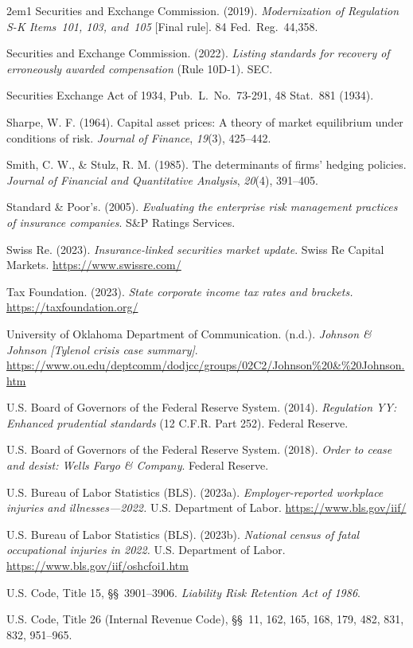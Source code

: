 \begin{hangparas}{2em}{1}
Securities and Exchange Commission. (2019). \emph{Modernization of Regulation
S-K Items~101, 103, and~105} [Final rule]. 84 Fed.\ Reg.\ 44,358.

Securities and Exchange Commission. (2022). \emph{Listing standards for
recovery of erroneously awarded compensation} (Rule 10D-1). SEC.

Securities Exchange Act of 1934, Pub.\ L.\ No.\ 73-291, 48 Stat.\ 881 (1934).

Sharpe, W. F. (1964). Capital asset prices: A theory of market equilibrium
under conditions of risk. \emph{Journal of Finance}, \emph{19}(3), 425--442.

Smith, C. W., \& Stulz, R. M. (1985). The determinants of firms' hedging
policies. \emph{Journal of Financial and Quantitative Analysis},
\emph{20}(4), 391--405.

Standard \& Poor's. (2005). \emph{Evaluating the enterprise risk management
practices of insurance companies}. S\&P Ratings Services.

Swiss Re. (2023). \emph{Insurance-linked securities market update}. Swiss Re
Capital Markets. \url{https://www.swissre.com/}

Tax Foundation. (2023). \emph{State corporate income tax rates and brackets.}
\url{https://taxfoundation.org/}

University of Oklahoma Department of Communication. (n.d.). \emph{Johnson \&
Johnson [Tylenol crisis case summary]}.
\url{https://www.ou.edu/deptcomm/dodjcc/groups/02C2/Johnson\%20\&\%20Johnson.htm}

U.S. Board of Governors of the Federal Reserve System. (2014).
\emph{Regulation YY: Enhanced prudential standards} (12 C.F.R. Part 252).
Federal Reserve.

U.S. Board of Governors of the Federal Reserve System. (2018). \emph{Order
to cease and desist: Wells Fargo \& Company}. Federal Reserve.

U.S. Bureau of Labor Statistics (BLS). (2023a). \emph{Employer-reported
workplace injuries and illnesses---2022.} U.S. Department of Labor.
\url{https://www.bls.gov/iif/}

U.S. Bureau of Labor Statistics (BLS). (2023b). \emph{National census of fatal
occupational injuries in 2022.} U.S. Department of Labor.
\url{https://www.bls.gov/iif/oshcfoi1.htm}

U.S. Code, Title 15, \S\S~3901--3906. \emph{Liability Risk Retention Act of
1986}.

U.S. Code, Title 26 (Internal Revenue Code), \S\S~11, 162, 165, 168, 179,
482, 831, 832, 951--965.


\end{hangparas}
